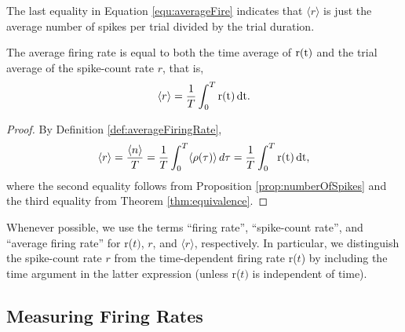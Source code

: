 \begin{rem}
  The last equality in Equation \ref{equ:averageFire} indicates that $\langle r\rangle $ is just the average number of spikes per trial divided by the trial duration.
\end{rem}

\begin{prop}
  The average firing rate is equal to
  both the time average of $\rm{r}(t)$ and the trial average of the spike-count rate $r$, that is,
  \begin{equation}
    \label{equ:1.7}
    \langle r\rangle =\frac{1}{T}\int_{0}^{T}\rm{r}(t)\,dt.
  \end{equation}
  \begin{proof}
    By Definition \ref{def:averageFiringRate},
    \begin{displaymath}
    \langle r\rangle =\frac{\langle n\rangle }{T}
    =\frac{1}{T}\int_{0}^{T} \langle\rho(\tau) \rangle \,d\tau =\frac{1}{T}\int_{0}^{T}\rm{r}(t)\,dt,
  \end{displaymath}
  where the second equality follows from Proposition \ref{prop:numberOfSpikes} and the third equality from Theorem \ref{thm:equivalence}. 
  \end{proof}
\end{prop}

\begin{rem}
  Whenever possible, we use the terms “firing rate”, “spike-count rate”, 
  and “average firing rate” for r($t)$, $r$, and $\langle  r\rangle  $, respectively. In particular, 
we distinguish the spike-count rate $r$
from the time-dependent firing rate r($t$) by
including the time argument in the latter expression (unless r($t)$ is independent of time).
\end{rem}

\subsection{Measuring Firing Rates}

